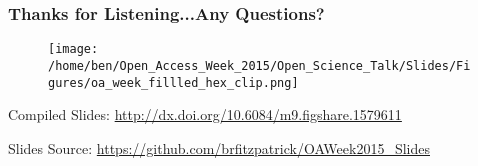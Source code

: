 \documentclass[xcolor=dvipsnames]{beamer}
\begin{document}
\begin{frame}
\frametitle{Thanks for Listening...Any Questions?}
\begin{center}
\begin{figure}
\texttt{[image: /home/ben/Open\_Access\_Week\_2015/Open\_Science\_Talk/Slides/Figures/oa\_week\_fillled\_hex\_clip.png]}
\end{figure}
\end{center}
\end{frame}

\begin{frame}
\begin{block}{Compiled Slides:}
\small \url{http://dx.doi.org/10.6084/m9.figshare.1579611}
\end{block}

\begin{block}{Slides Source:}
\small \url{https://github.com/brfitzpatrick/OAWeek2015_Slides}
\end{block}
\end{frame}
\end{document}
